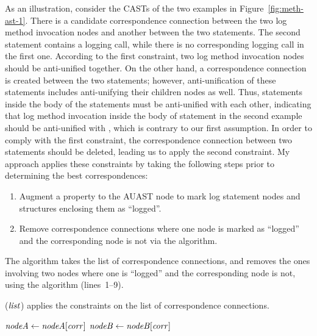 As an illustration, consider the CASTs of the two examples in Figure~\ref{fig:meth-ast-1}. There is a candidate correspondence connection between the two log method invocation nodes and another between the two  statements. The second  statement contains a logging call, while there is no corresponding logging call in the first one. According to the first constraint, two log method invocation nodes should be anti-unified together. On the other hand, a correspondence connection is created between the two  statements; however, anti-unification of these statements includes anti-unifying their children nodes as well. Thus, statements inside the body of the  statements must be anti-unified with each other, indicating that log method invocation inside the body of  statement in the second example should be anti-unified with \nothing, which is contrary to our first assumption. In order to comply with the first constraint, the correspondence connection between two  statements should be deleted, leading us to apply the second constraint. My approach applies these constraints by taking the following steps prior to determining the best correspondences:
\begin{enumerate} [leftmargin=.4in]
\item	Augment a property to the AUAST node to mark log statement nodes and structures enclosing them as ``logged''.
\item	Remove correspondence connections where one node is marked as ``logged'' and the corresponding node is not via the  algorithm.
\end{enumerate}

The  algorithm takes the list of correspondence connections, and removes the ones involving two nodes where one is ``logged'' and the corresponding node is not, using the  algorithm (lines~1--9).

\begin{algorithm}
  \caption{($\mathit{list}$) applies the constraints on the list of correspondence connections.}
  \label{computeMatches}
  \begin{algorithmic}[1]
  \ApplyConstraints
      \State $\mathit{nodeA} \gets \mathit{nodeA}[\mathit{corr}]$
	  \State $\mathit{nodeB} \gets \mathit{nodeB}[\mathit{corr}]$
	  \EndIf 		
 \EndFor 	
	
  \end{algorithmic}
\end{algorithm}




